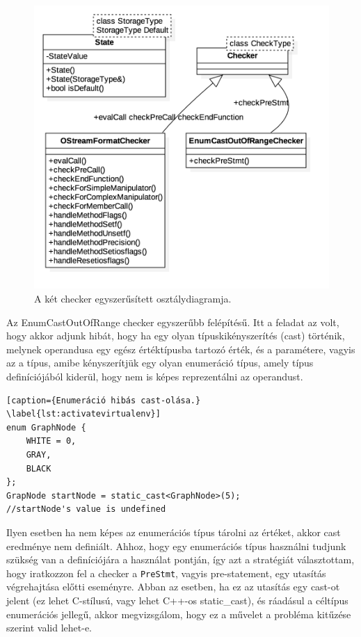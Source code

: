 \documentclass[a4paper,12pt]{report}
\begin{document}
\begin{figure}[h]
\caption{A két checker egyszerűsített osztálydiagramja.}
\centering
\includegraphics[scale=0.4]{checkers.png}
\end{figure}

Az EnumCastOutOfRange checker egyszerűbb felépítésű. Itt a feladat az volt, hogy akkor adjunk hibát, hogy ha egy olyan típuskikényszerítés (cast) történik, melynek operandusa egy egész értéktípusba tartozó érték, és a paramétere, vagyis az a típus, amibe kényszerítjük egy olyan enumeráció típus, amely típus definíciójából kiderül, hogy nem is képes reprezentálni az operandust.

\begin{lstlisting}[caption={Enumeráció hibás cast-olása.}
\label{lst:activatevirtualenv}]
enum GraphNode {
	WHITE = 0,
	GRAY,
	BLACK
};
GrapNode startNode = static_cast<GraphNode>(5);
//startNode's value is undefined
\end{lstlisting}

Ilyen esetben ha nem képes az enumerációs típus tárolni az értéket, akkor cast eredménye nem definiált. Ahhoz, hogy egy enumerációs típus használni tudjunk szükség van a definíciójára a használat pontján, így azt a stratégiát választottam, hogy iratkozzon fel a checker a \texttt{PreStmt}, vagyis pre-statement, egy utasítás végrehajtása előtti eseményre. Abban az esetben, ha ez az utasítás egy cast-ot jelent (ez lehet C-stílusú, vagy lehet C++-os static\_cast), és ráadásul a céltípus enumerációs jellegű, akkor megvizsgálom, hogy ez a művelet a probléma kitűzése szerint valid lehet-e.
\end{document}
